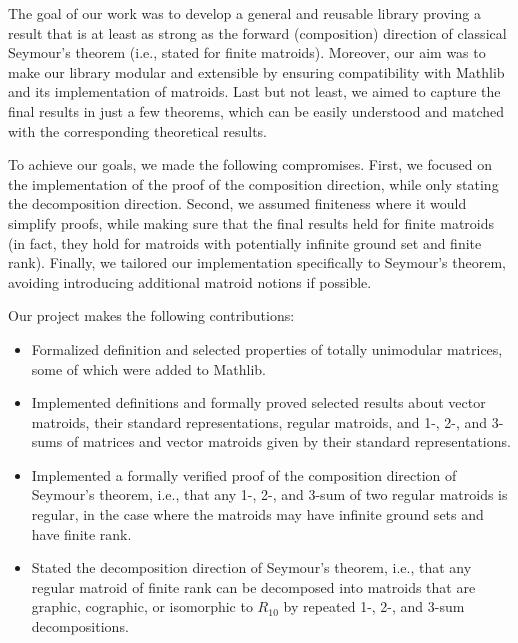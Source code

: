 The goal of our work was to develop a general and reusable library proving a result that is at least as strong as the forward (composition) direction of classical Seymour's theorem (i.e., stated for finite matroids). Moreover, our aim was to make our library modular and extensible by ensuring compatibility with Mathlib and its implementation of matroids. Last but not least, we aimed to capture the final results in just a few theorems, which can be easily understood and matched with the corresponding theoretical results.

To achieve our goals, we made the following compromises. First, we focused on the implementation of the proof of the composition direction, while only stating the decomposition direction. Second, we assumed finiteness where it would simplify proofs, while making sure that the final results held for finite matroids (in fact, they hold for matroids with potentially infinite ground set and finite rank). Finally, we tailored our implementation specifically to Seymour's theorem, avoiding introducing additional matroid notions if possible.

Our project makes the following contributions:
\begin{itemize}
    \item Formalized definition and selected properties of totally unimodular matrices, some of which were added to Mathlib.
    \item Implemented definitions and formally proved selected results about vector matroids, their standard representations, regular matroids, and 1-, 2-, and 3-sums of matrices and vector matroids given by their standard representations.
    \item Implemented a formally verified proof of the composition direction of Seymour's theorem, i.e., that any 1-, 2-, and 3-sum of two regular matroids is regular, in the case where the matroids may have infinite ground sets and have finite rank.
    \item Stated the decomposition direction of Seymour's theorem, i.e., that any regular matroid of finite rank can be decomposed into matroids that are graphic, cographic, or isomorphic to $R_{10}$ by repeated 1-, 2-, and 3-sum decompositions.
\end{itemize}

